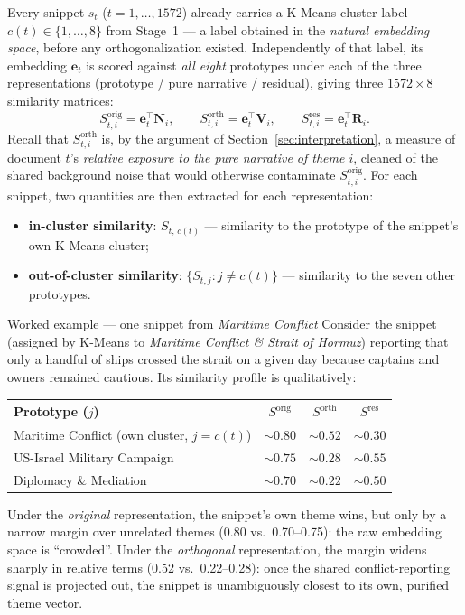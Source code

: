 \documentclass[11pt]{article}
\begin{document}
Every snippet $s_t$ ($t=1,\dots,1572$) already carries a K-Means cluster
label $c(t) \in \{1,\dots,8\}$ from Stage~1 --- a label obtained in the
\emph{natural embedding space}, before any orthogonalization existed.
Independently of that label, its embedding $\mathbf{e}_t$ is scored against
\emph{all eight} prototypes under each of the three representations
(prototype / pure narrative / residual), giving three $1572\times 8$
similarity matrices:
\[
S^{\text{orig}}_{t,i} = \mathbf{e}_t^\top \mathbf{N}_i, \qquad
S^{\text{orth}}_{t,i} = \mathbf{e}_t^\top \mathbf{V}_i, \qquad
S^{\text{res}}_{t,i} = \mathbf{e}_t^\top \mathbf{R}_i .
\]
Recall that $S^{\text{orth}}_{t,i}$ is, by the argument of
Section~\ref{sec:interpretation}, a measure of document $t$'s
\emph{relative exposure to the pure narrative of theme $i$}, cleaned of the
shared background noise that would otherwise contaminate
$S^{\text{orig}}_{t,i}$.
For each snippet, two quantities are then extracted for each representation:
\begin{itemize}
    \item \textbf{in-cluster similarity}: $S_{t,\,c(t)}$ --- similarity to the prototype of the snippet's own K-Means cluster;
    \item \textbf{out-of-cluster similarity}: $\{S_{t,j} : j \ne c(t)\}$ --- similarity to the seven other prototypes.
\end{itemize}

\begin{examplebox}{Worked example --- one snippet from \textit{Maritime Conflict}}
Consider the snippet (assigned by K-Means to \textit{Maritime Conflict \&
Strait of Hormuz}) reporting that only a handful of ships crossed the strait
on a given day because captains and owners remained cautious. Its similarity
profile is qualitatively:
\begin{center}
\begin{tabular}{lccc}
\toprule
Prototype ($j$) & $S^{\text{orig}}$ & $S^{\text{orth}}$ & $S^{\text{res}}$\\
\midrule
Maritime Conflict (own cluster, $j = c(t)$) & $\sim 0.80$ & $\sim 0.52$ & $\sim 0.30$\\
US-Israel Military Campaign & $\sim 0.75$ & $\sim 0.28$ & $\sim 0.55$\\
Diplomacy \& Mediation & $\sim 0.70$ & $\sim 0.22$ & $\sim 0.50$\\
\bottomrule
\end{tabular}
\end{center}
Under the \emph{original} representation, the snippet's own theme wins, but
only by a narrow margin over unrelated themes (0.80 vs.\ 0.70--0.75): the
raw embedding space is ``crowded''. Under the \emph{orthogonal}
representation, the margin widens sharply in relative terms (0.52 vs.\
0.22--0.28): once the shared conflict-reporting signal is projected out, the
snippet is unambiguously closest to its own, purified theme vector.
\end{examplebox}
\end{document}
